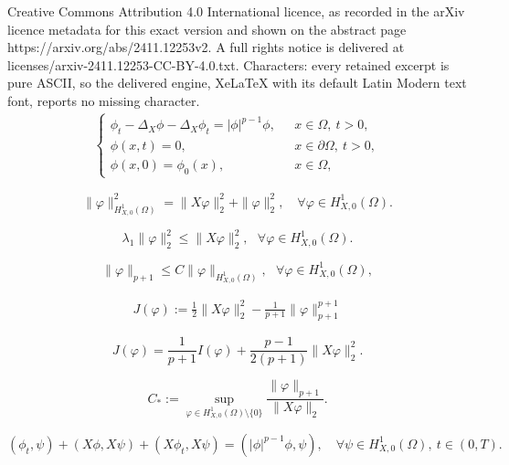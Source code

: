 \documentclass[10pt,a4paper]{amsart}
\newcommand{\ds}{\displaystyle}
\begin{document}
Creative Commons Attribution 4.0 International licence, as recorded in the arXiv licence metadata for this exact version and shown on the abstract page https://arxiv.org/abs/2411.12253v2. A full rights notice is delivered at licenses/arxiv-2411.12253-CC-BY-4.0.txt. Characters: every retained excerpt is pure ASCII, so the delivered engine, XeLaTeX with its default Latin Modern text font, reports no missing character.
\begin{align}\label{1.1}
 \left\{\begin{array}{ll}
     \ds \phi_{t}-\Delta_X\phi-\Delta_X\phi_t=|\phi|^{p-1}\phi,\ \ \ &x\in\Omega,\ t>0,\\
     \ds \phi(x,t)=0,&x\in\partial\Omega,\ t>0,\\
     \ds \phi(x,0)=\phi_0(x),\ \ &x\in\Omega,
    \end{array}\right.
\end{align}

\begin{equation}\label{Hfanshu}
\|\varphi\|_{H_{X,0}^1(\Omega)}^2=\|X\varphi\|_2^2+\|\varphi\|_2^2,\quad\forall\varphi\in H_{X,0}^1(\Omega).
\end{equation}

\begin{equation}\label{tezhengzhi}
\lambda_1\|\varphi\|_2^2\leq\|X\varphi\|_2^2,\ \ \ \forall\varphi\in H_{X,0}^1(\Omega).
\end{equation}

\begin{equation}\label{x1111-33}
\|\varphi\|_{p+1}\leq C\|\varphi\|_{H_{X,0}^1(\Omega)},\ \ \ \forall\varphi\in H_{X,0}^1(\Omega),
\end{equation}

\begin{align}
J(\varphi):=\frac{1}{2}\|X\varphi\|_2^2-\frac{1}{p+1}\|\varphi\|_{p+1}^{p+1}\label{J}
\end{align}

\begin{equation}\label{JI}
J(\varphi)=\frac{1}{p+1}I(\varphi)+\frac{p-1}{2(p+1)}\|X\varphi\|_2^2.
\end{equation}

\begin{equation}\label{qianru}
C_*:=\sup_{\varphi\in H_{X,0}^1(\Omega)\setminus\{0\}}\frac{\|\varphi\|_{p+1}}{\|X\varphi\|_2}.
\end{equation}

\begin{equation}\label{weakdengshi}
(\phi_t,\psi)+(X\phi,X\psi)+(X\phi_t,X\psi)=(|\phi|^{p-1}\phi,\psi),\quad  \forall\psi\in H_{X,0}^1(\Omega),~t\in(0,T).
\end{equation}
\end{document}
